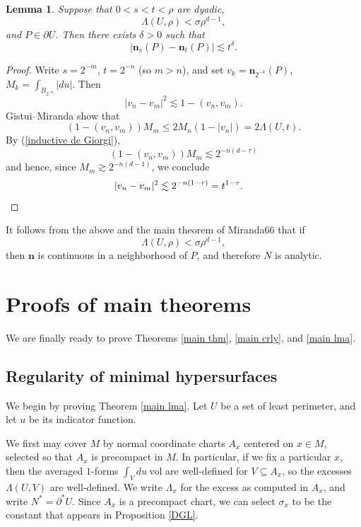 \documentclass[reqno,12pt,letterpaper]{amsart}
\newcommand{\normal}{\mathbf n}
\newcommand{\vol}{\mathrm{vol}}
\newtheorem{lemma}[theorem]{Lemma}
\theoremstyle{definition}
\numberwithin{equation}{section}
\begin{document}
\begin{lemma}
Suppose that $0 < s < t < \rho$ are dyadic,
$$\Lambda(U, \rho) < \sigma \rho^{d - 1},$$
and $P \in \partial U$.
Then there exists $\delta > 0$ such that
$$|\normal_s(P) - \normal_t(P)| \lesssim t^\delta.$$
\end{lemma}
\begin{proof}
Write $s = 2^{-m}$, $t = 2^{-n}$ (so $m > n$), and set $v_k = \normal_{2^{-k}}(P)$, $M_k = \int_{B_{2^{-k}}} |du|$.
Then
$$|v_n - v_m|^2 \lesssim 1 - (v_n, v_m).$$
Gistui--Miranda show that
$$(1 - (v_n, v_m))M_m \leq 2M_n(1 - |v_n|) = 2\Lambda(U, t).$$
By (\ref{inductive de Giorgi}),
$$(1 - (v_n, v_m))M_m \lesssim 2^{-n(d - \tau)}$$
and hence, since $M_m \gtrsim 2^{-n(d - 1)}$, we conclude
\begin{align*}
|v_n - v_m|^2 &\lesssim 2^{-n(1 - \tau)} = t^{1 - \tau}. \qedhere
\end{align*}
\end{proof}

It follows from the above and the main theorem of Miranda66 that if
$$\Lambda(U, \rho) < \sigma \rho^{d - 1},$$
then $\normal$ is continuous in a neighborhood of $P$, and therefore $N$ is analytic.




\section{Proofs of main theorems}\label{proof of main thm}
We are finally ready to prove Theorems \ref{main thm}, \ref{main crly}, and \ref{main lma}.

\subsection{Regularity of minimal hypersurfaces}
We begin by proving Theorem \ref{main lma}.
Let $U$ be a set of least perimeter, and let $u$ be its indicator function.

We first may cover $M$ by normal coordinate charts $A_x$ centered on $x \in M$, selected so that $A_x$ is precompact in $M$.
In particular, if we fix a particular $x$, then the averaged $1$-forms $\int_V du ~\vol$ are well-defined for $V \subseteq A_x$, so the excesses $\Lambda(U, V)$ are well-defined.
We write $\Lambda_x$ for the excess as computed in $A_x$, and write $N^* = \partial^* U$.
Since $A_x$ is a precompact chart, we can select $\sigma_x$ to be the constant that appears in Proposition \ref{DGL}.
\end{document}
